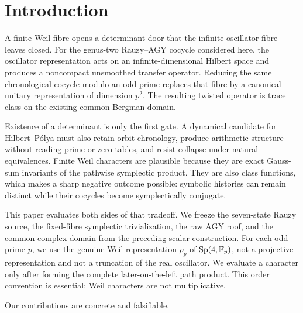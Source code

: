 \section{Introduction}

A finite Weil fibre opens a determinant door that the infinite oscillator
fibre leaves closed.  For the genus-two Rauzy--AGY cocycle considered here,
the oscillator representation acts on an infinite-dimensional Hilbert space
and produces a noncompact unsmoothed transfer operator.  Reducing the same
chronological cocycle modulo an odd prime replaces that fibre by a canonical
unitary representation of dimension \(p^2\).  The resulting twisted operator
is trace class on the existing common Bergman domain.

Existence of a determinant is only the first gate.  A dynamical candidate for
Hilbert--P\'olya must also retain orbit chronology, produce arithmetic
structure without reading prime or zero tables, and resist collapse under
natural equivalences.  Finite Weil characters are plausible because they
are exact Gauss-sum invariants of the pathwise symplectic product.  They are
also class functions, which makes a sharp negative outcome possible: symbolic
histories can remain distinct while their cocycles become symplectically
conjugate.

This paper evaluates both sides of that tradeoff.  We freeze the seven-state
Rauzy source, the fixed-fibre symplectic trivialization, the raw AGY roof, and
the common complex domain from the preceding scalar construction.  For each
odd prime \(p\), we use the genuine Weil representation \(\rho_p\) of
\(\operatorname{Sp}(4,\mathbb{F}_p)\), not a projective representation and not a truncation of the
real oscillator.  We evaluate a character only after forming the complete
later-on-the-left path product.  This order convention is essential: Weil
characters are not multiplicative.

Our contributions are concrete and falsifiable.

